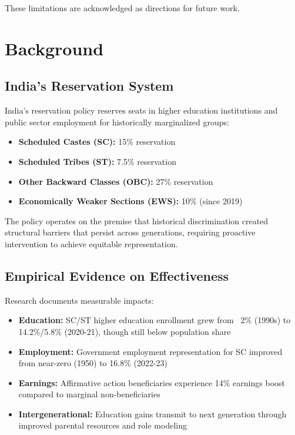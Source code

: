 \documentclass[10pt,twocolumn]{article}
\begin{document}
These limitations are acknowledged as directions for future work.

\section{Background}

\subsection{India's Reservation System}

India's reservation policy reserves seats in higher education institutions and public sector employment for historically marginalized groups:

\begin{itemize}
    \item \textbf{Scheduled Castes (SC):} 15\% reservation
    \item \textbf{Scheduled Tribes (ST):} 7.5\% reservation
    \item \textbf{Other Backward Classes (OBC):} 27\% reservation
    \item \textbf{Economically Weaker Sections (EWS):} 10\% (since 2019)
\end{itemize}

The policy operates on the premise that historical discrimination created structural barriers that persist across generations, requiring proactive intervention to achieve equitable representation.

\subsection{Empirical Evidence on Effectiveness}

Research documents measurable impacts:

\begin{itemize}
    \item \textbf{Education:} SC/ST higher education enrollment grew from ~2\% (1990s) to 14.2\%/5.8\% (2020-21), though still below population share \cite{aishe2021}
    \item \textbf{Employment:} Government employment representation for SC improved from near-zero (1950) to 16.8\% (2022-23) \cite{govt_employment}
    \item \textbf{Earnings:} Affirmative action beneficiaries experience 14\% earnings boost compared to marginal non-beneficiaries \cite{brazil_aa}
    \item \textbf{Intergenerational:} Education gains transmit to next generation through improved parental resources and role modeling
\end{itemize}
\end{document}
